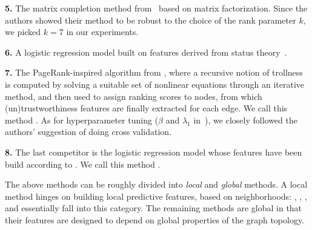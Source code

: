 {\bf 5.} The matrix completion method from~\cite{LowRankCompletion14} based on \complowrank{} matrix factorization. Since the authors showed their method to be robust to the choice of the rank parameter $k$, we picked $k=7$ in our experiments.
%

{\bf 6.} A logistic regression model built on \comptriads{} features derived from status theory~\cite{Leskovec2010}.
%

{\bf 7.} The PageRank-inspired algorithm from \cite{wu2016troll}, where a recursive notion of trollness is computed by solving a suitable set of nonlinear equations through an iterative method, and then used to assign ranking scores to nodes, from which (un)trustworthiness features are finally extracted for each edge. We call this method \compranknodes{}. As for hyperparameter tuning ($\beta$ and $\lambda_1$ in~\cite{wu2016troll}), we closely followed the authors' suggestion of doing cross validation.
%

{\bf 8.} The last competitor is the logistic regression model whose features have been build according to \cite{Bayesian15}. We call this method \compbayesian{}.

The above methods can be roughly divided into {\em local} and {\em global} methods. A local method hinges on building local predictive features, based on neighborhoods: \usrule{}, \uslogregp{}, \comptriads{}, and \compbayesian{} essentially fall into this category. The remaining methods 
are global in that their features are designed to depend on global properties of the graph topology.

